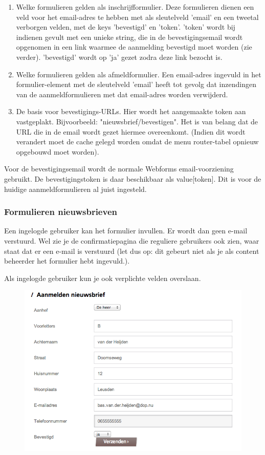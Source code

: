 \begin{enumerate}
\item Welke formulieren gelden als inschrijfformulier. Deze formulieren dienen een veld voor het email-adres te hebben met als sleutelveld 'email' en een tweetal verborgen velden, met de keys 'bevestigd' en 'token'. 'token' wordt bij indienen gevult met een unieke string, die in de bevestigingsemail wordt opgenomen in een link waarmee de aanmelding bevestigd moet worden (zie verder). 'bevestigd' wordt op 'ja' gezet zodra deze link bezocht is.

\item Welke formulieren gelden als afmeldformulier. Een email-adres ingevuld in het formulier-element met de sleutelveld 'email' heeft tot gevolg dat inzendingen van de aanmeldformulieren met dat email-adres worden verwijderd.

\item De basis voor bevestigings-URLs. Hier wordt het aangemaakte token aan vastgeplakt. Bijvoorbeeld: "nieuwsbrief/bevestigen". Het is van belang dat de URL die in de email wordt gezet hiermee overeenkomt. (Indien dit wordt verandert moet de cache gelegd worden omdat de menu router-tabel opnieuw opgebouwd moet worden).
\end{enumerate}

Voor de bevestigingsemail wordt de normale Webforms email-voorziening gebruikt. De bevestigingstoken is daar beschikbaar als value[token]. Dit is voor de huidige aanmeldformulieren al juist ingesteld.

\subsubsection{Formulieren nieuwsbrieven}

Een ingelogde gebruiker kan het formulier invullen. Er wordt dan geen e-mail verstuurd. Wel zie je de confirmatiepagina die reguliere gebruikers ook zien, waar staat dat er een e-mail is verstuurd (let dus op: dit gebeurt niet als je als content beheerder het formulier hebt ingevuld.).

Als ingelogde gebruiker kun je ook verplichte velden overslaan.

\begin{figure}[p]
\centering
\includegraphics[width=\textwidth]{img/nieuwsbrief/nieuwsbrief_formulier.png}
\end{figure}


